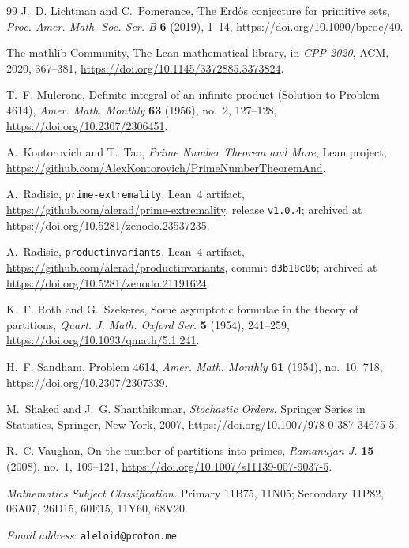 \documentclass[11pt]{article}
\theoremstyle{remark}
\begin{document}
\begin{thebibliography}{99}
J.~D. Lichtman and C.~Pomerance,
The Erd\H{o}s conjecture for primitive sets,
\emph{Proc. Amer. Math. Soc. Ser. B} \textbf{6} (2019), 1--14,
\url{https://doi.org/10.1090/bproc/40}.

The mathlib Community,
The Lean mathematical library,
in \emph{CPP 2020}, ACM, 2020, 367--381,
\url{https://doi.org/10.1145/3372885.3373824}.

T.~F. Mulcrone,
Definite integral of an infinite product (Solution to Problem 4614),
\emph{Amer. Math. Monthly} \textbf{63} (1956), no.~2, 127--128,
\url{https://doi.org/10.2307/2306451}.

A.~Kontorovich and T.~Tao,
\emph{Prime Number Theorem and More}, Lean project,
\url{https://github.com/AlexKontorovich/PrimeNumberTheoremAnd}.

A.~Radisic,
\texttt{prime-extremality}, Lean~4 artifact,
\url{https://github.com/alerad/prime-extremality}, release
\texttt{v1.0.4}; archived at
\url{https://doi.org/10.5281/zenodo.23537235}.

A.~Radisic,
\texttt{productinvariants}, Lean~4 artifact,
\url{https://github.com/alerad/productinvariants}, commit
\texttt{d3b18c06}; archived at
\url{https://doi.org/10.5281/zenodo.21191624}.

K.~F. Roth and G.~Szekeres,
Some asymptotic formulae in the theory of partitions,
\emph{Quart. J. Math. Oxford Ser.} \textbf{5} (1954), 241--259,
\url{https://doi.org/10.1093/qmath/5.1.241}.

H.~F. Sandham,
Problem 4614,
\emph{Amer. Math. Monthly} \textbf{61} (1954), no.~10, 718,
\url{https://doi.org/10.2307/2307339}.

M.~Shaked and J.~G. Shanthikumar,
\emph{Stochastic Orders},
Springer Series in Statistics, Springer, New York, 2007,
\url{https://doi.org/10.1007/978-0-387-34675-5}.

R.~C. Vaughan,
On the number of partitions into primes,
\emph{Ramanujan J.} \textbf{15} (2008), no.~1, 109--121,
\url{https://doi.org/10.1007/s11139-007-9037-5}.

\end{thebibliography}

\medskip
{} \emph{Mathematics Subject Classification.} Primary
11B75, 11N05; Secondary 11P82, 06A07, 26D15, 60E15, 11Y60, 68V20.

\smallskip
\noindent\textit{Email address}: \texttt{aleloid@proton.me}
\end{document}
